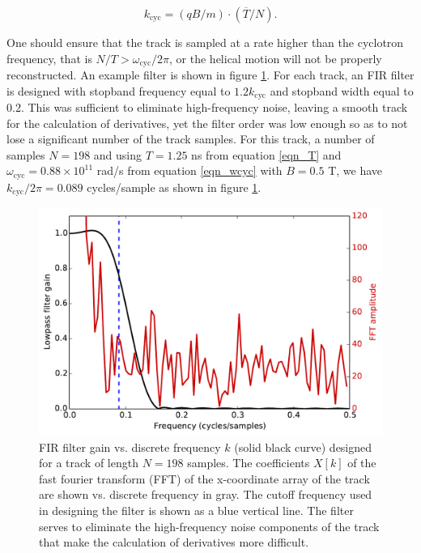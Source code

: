 \documentclass{JINST}
\begin{document}
\begin{equation}\label{eqn_kcyc}
k_{\mathrm{cyc}} = (qB/m)\cdot(\overline{T}/N).
\end{equation}

One should ensure that the track is sampled at a rate higher than the cyclotron
frequency, that is $N/T > \omega_{\mathrm{cyc}}/2\pi$, or the helical motion will not be properly
reconstructed.  An example filter is shown in figure \ref{fig_FIR}.  For each track, an FIR filter is designed with 
stopband frequency equal to $1.2k_{\mathrm{cyc}}$ and stopband width equal to 0.2.  This was sufficient to 
eliminate high-frequency noise, leaving a smooth track for the calculation of derivatives, yet the filter order was
low enough so as to not lose a significant number of the track samples.  For this track, a number of samples 
$N = 198$ and using $T = 1.25$ ns from equation \ref{eqn_T} and $\omega_{\mathrm{cyc}} = 0.88 \times 
10^{11}$ rad/s from equation \ref{eqn_wcyc} with $B = 0.5$ T, we have $k_{\mathrm{cyc}}/2\pi = 0.089$ 
cycles/sample as shown in figure \ref{fig_FIR}.

\begin{figure}[!htb]
	\centering
	\includegraphics[scale=0.48]{fig/FIR_freq_resp_nmagse2_6.pdf}
	\caption{\label{fig_FIR}FIR filter gain vs. discrete frequency $k$ (solid black curve) designed for a track of length $N = 198$ samples.  The coefficients $X[k]$ of the fast fourier transform (FFT) of the x-coordinate array of the track are shown vs. discrete frequency in gray.  The cutoff frequency used in designing the filter is shown as a blue vertical line.  The filter serves to eliminate the high-frequency noise components of the track that make the calculation of derivatives more difficult.}
\end{figure}
\end{document}

